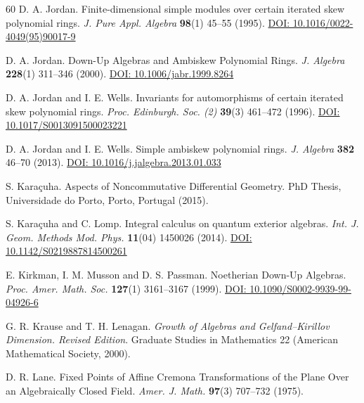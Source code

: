 \documentclass{amsart}
\theoremstyle{definition}
\theoremstyle{remark}
\numberwithin{equation}{section}
\begin{document}
\begin{thebibliography}{60}
 D. A. Jordan. Finite-dimensional simple modules over certain iterated skew polynomial rings. {\em J. Pure Appl. Algebra} {\bf 98}(1) 45--55 (1995). \href{https://doi.org/10.1016/0022-4049(95)90017-9}{DOI: 10.1016/0022-4049(95)90017-9}

 D. A. Jordan. Down-Up Algebras and Ambiskew Polynomial Rings. {\em J. Algebra} {\bf 228}(1) 311--346 (2000). \href{https://doi.org/10.1006/jabr.1999.8264}{DOI: 10.1006/jabr.1999.8264}


 D. A. Jordan and I. E. Wells. Invariants for automorphisms of certain iterated skew polynomial rings. {\em Proc. Edinburgh. Soc. (2)} {\bf 39}(3) 461--472 (1996). \href{ https://doi.org/10.1017/S0013091500023221}{DOI: 10.1017/S0013091500023221}

 D. A. Jordan and I. E. Wells. Simple ambiskew polynomial rings. {\em J. Algebra} {\bf 382} 46--70 (2013). \href{https://doi.org/10.1016/j.jalgebra.2013.01.033}{DOI: 10.1016/j.jalgebra.2013.01.033}

 S. Kara\c cuha. Aspects of Noncommutative Differential Geometry. PhD Thesis, Universidade do Porto, Porto, Portugal (2015).

 S. Kara\c cuha and C. Lomp. Integral calculus on quantum exterior algebras. {\em Int. J. Geom. Methods Mod. Phys.} {\bf 11}(04) 1450026 (2014). \href{https://doi.org/10.1142/S0219887814500261}{DOI: 10.1142/S0219887814500261}

 E. Kirkman, I. M. Musson and D. S. Passman. Noetherian Down-Up Algebras. {\em Proc. Amer. Math. Soc.} {\bf 127}(1) 3161--3167 (1999). \href{https://doi.org/10.1090/S0002-9939-99-04926-6}{DOI: 10.1090/S0002-9939-99-04926-6}

 G. R. Krause and T. H. Lenagan. {\em Growth of Algebras and Gelfand–Kirillov Dimension. Revised Edition}. Graduate Studies in Mathematics 22 (American Mathematical Society, 2000).

 D. R. Lane. Fixed Points of Affine Cremona Transformations of the Plane Over an Algebraically Closed Field. {\em Amer. J. Math.} {\bf 97}(3) 707--732 (1975). 


\end{thebibliography}
\end{document}
